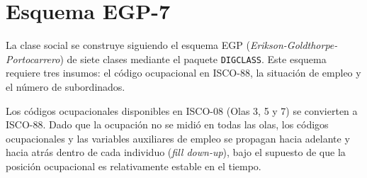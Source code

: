 \documentclass[
  spanish,
  a4paper,
  oneside]{scrbook}
\begin{document}
\section{Esquema EGP-7}\label{esquema-egp-7}

La clase social se construye siguiendo el esquema EGP
(\emph{Erikson-Goldthorpe-Portocarrero}) de siete clases mediante el
paquete \texttt{DIGCLASS}. Este esquema requiere tres insumos: el código
ocupacional en ISCO-88, la situación de empleo y el número de
subordinados.

Los códigos ocupacionales disponibles en ISCO-08 (Olas 3, 5 y 7) se
convierten a ISCO-88. Dado que la ocupación no se midió en todas las
olas, los códigos ocupacionales y las variables auxiliares de empleo se
propagan hacia adelante y hacia atrás dentro de cada individuo
(\emph{fill down-up}), bajo el supuesto de que la posición ocupacional
es relativamente estable en el tiempo.
\end{document}
